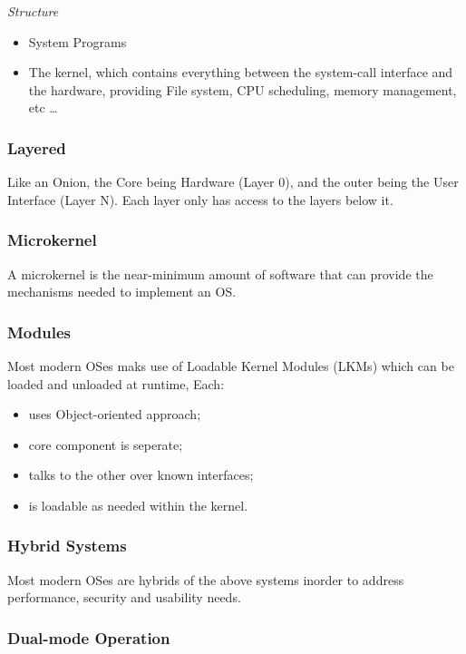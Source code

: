 \documentclass[]{article}
\begin{document}
\emph{Structure}
\begin{itemize}
    \item System Programs
    \item The kernel, which contains everything between the system-call interface and the hardware, providing File system, CPU scheduling, memory management, etc \dots
\end{itemize}

\subsubsection*{Layered}

Like an Onion, the Core being Hardware (Layer 0), and the outer being the User Interface (Layer N). Each layer only has access to the layers below it.

\subsubsection*{Microkernel}

A microkernel is the near-minimum amount of software that can provide the mechanisms needed to implement an OS.

\subsubsection*{Modules}

Most modern OSes maks use of Loadable Kernel Modules (LKMs) which can be loaded and unloaded at runtime, Each:
\begin{itemize}
    \item uses Object-oriented approach;
    \item core component is seperate;
    \item talks to the other over known interfaces;
    \item is loadable as needed within the kernel.
\end{itemize}

\subsubsection*{Hybrid Systems}

Most modern OSes are hybrids of the above systems inorder to address performance, security and usability needs.

\subsubsection*{Dual-mode Operation}
\end{document}
